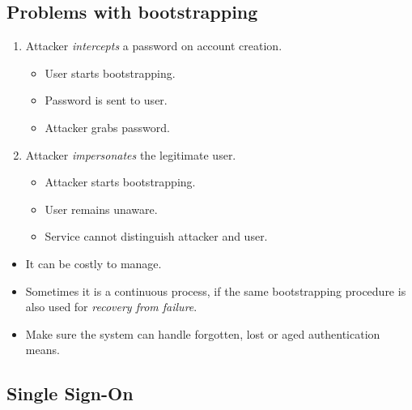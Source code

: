 \subsection{Problems with bootstrapping}

\begin{frame}
  \begin{enumerate}
    \item Attacker \emph{intercepts} a password on account creation.
      \begin{itemize}
        \item User starts bootstrapping.
        \item Password is sent to user.
        \item Attacker grabs password.
      \end{itemize}

      \pause{}

    \item Attacker \emph{impersonates} the legitimate user.
      \begin{itemize}
        \item Attacker starts bootstrapping.
        \item User remains unaware.
        \item Service cannot distinguish attacker and user.
      \end{itemize}
  \end{enumerate}
\end{frame}

\begin{frame}
  \begin{itemize}
    \item It can be costly to manage.

    \item Sometimes it is a continuous process, if the same bootstrapping 
      procedure is also used for \emph{recovery from failure}.

    \item Make sure the system can handle forgotten, lost or aged 
      authentication means.

  \end{itemize}
\end{frame}

\subsection{Single Sign-On}

